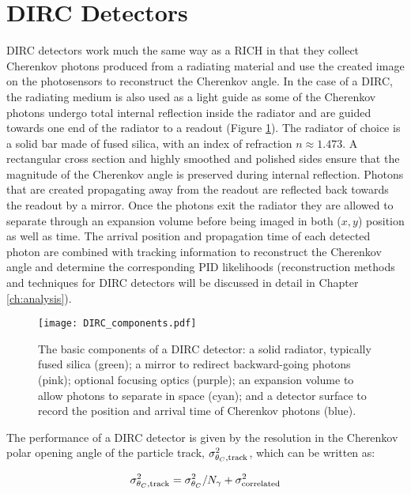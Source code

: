 \section{DIRC Detectors}
DIRC detectors work much the same way as a RICH in that they collect Cherenkov photons produced from a radiating material and use the created image on the photosensors to reconstruct the Cherenkov angle. In the case of a DIRC, the radiating medium is also used as a light guide as some of the Cherenkov photons undergo total internal reflection inside the radiator and are guided towards one end of the radiator to a readout (Figure \ref{fig:dircbasics}). The radiator of choice is a solid bar made of fused silica, with an index of refraction $n \approx 1.473$. A rectangular cross section and highly smoothed and polished sides ensure that the magnitude of the Cherenkov angle is preserved during internal reflection. Photons that are created propagating away from the readout are reflected back towards the readout by a mirror. Once the photons exit the radiator they are allowed to separate through an expansion volume before being imaged in both ($x, y$) position as well as time. The arrival position and propagation time of each detected photon are combined with tracking information to reconstruct the Cherenkov angle and determine the corresponding PID likelihoods (reconstruction methods and techniques for DIRC detectors will be discussed in detail in Chapter \ref{ch:analysis}).

\begin{figure}[ht]
	\centering
	\texttt{[image: DIRC\_components.pdf]}
	\caption{The basic components of a DIRC detector: a solid radiator, typically fused silica (green); a mirror to redirect backward-going photons (pink); optional focusing optics (purple); an expansion volume to allow photons to separate in space (cyan); and a detector surface to record the position and arrival time of Cherenkov photons (blue).}
	\label{fig:dircbasics}
\end{figure}

The performance of a DIRC detector is given by the resolution in the Cherenkov polar opening angle of the particle track, $\sigma_{\theta_{C},\text{track}}^2$, which can be written as:

\begin{equation}
	\sigma_{\theta_{C},\text{track}}^2 = \sigma_{\theta_{C}}^2 / N_{\gamma} + \sigma_{\text{correlated}}^2
	\label{eq:performance}
\end{equation}

